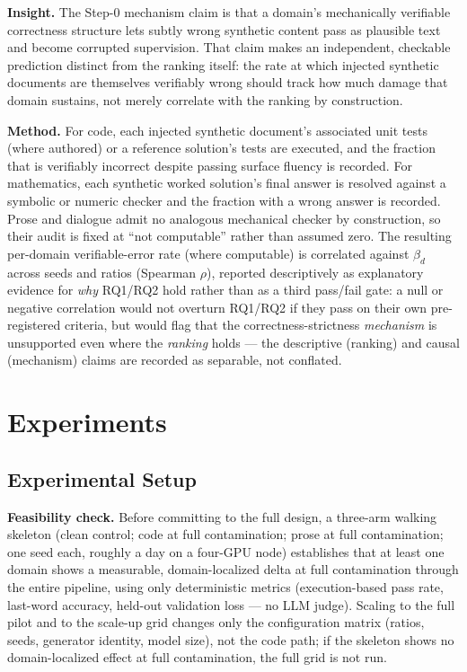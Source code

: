 \documentclass[11pt]{article}
\begin{document}
\textbf{Insight.} The Step-0 mechanism claim is that a domain's mechanically verifiable correctness structure lets subtly wrong synthetic content pass as plausible text and become corrupted supervision. That claim makes an independent, checkable prediction distinct from the ranking itself: the rate at which injected synthetic documents are themselves verifiably wrong should track how much damage that domain sustains, not merely correlate with the ranking by construction.

\textbf{Method.} For code, each injected synthetic document's associated unit tests (where authored) or a reference solution's tests are executed, and the fraction that is verifiably incorrect despite passing surface fluency is recorded. For mathematics, each synthetic worked solution's final answer is resolved against a symbolic or numeric checker and the fraction with a wrong answer is recorded. Prose and dialogue admit no analogous mechanical checker by construction, so their audit is fixed at ``not computable'' rather than assumed zero. The resulting per-domain verifiable-error rate (where computable) is correlated against $\beta_d$ across seeds and ratios (Spearman $\rho$), reported descriptively as explanatory evidence for \emph{why} RQ1/RQ2 hold rather than as a third pass/fail gate: a null or negative correlation would not overturn RQ1/RQ2 if they pass on their own pre-registered criteria, but would flag that the correctness-strictness \emph{mechanism} is unsupported even where the \emph{ranking} holds --- the descriptive (ranking) and causal (mechanism) claims are recorded as separable, not conflated.

\section{Experiments}

\subsection{Experimental Setup}

\textbf{Feasibility check.} Before committing to the full design, a three-arm walking skeleton (clean control; code at full contamination; prose at full contamination; one seed each, roughly a day on a four-GPU node) establishes that at least one domain shows a measurable, domain-localized delta at full contamination through the entire pipeline, using only deterministic metrics (execution-based pass rate, last-word accuracy, held-out validation loss --- no LLM judge). Scaling to the full pilot and to the scale-up grid changes only the configuration matrix (ratios, seeds, generator identity, model size), not the code path; if the skeleton shows no domain-localized effect at full contamination, the full grid is not run.
\end{document}
